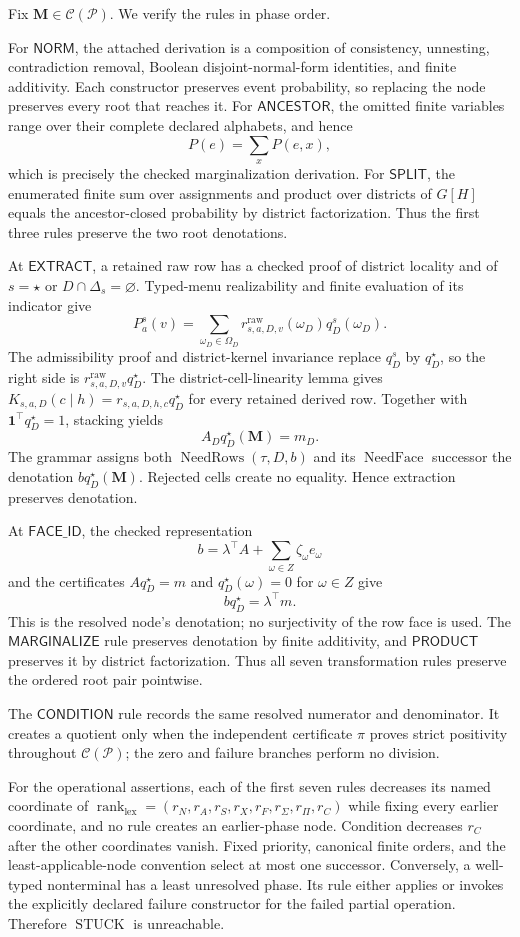 Fix \(\mathbf M\in\mathcal C(\mathcal P)\).  We verify the rules in phase order.

For \(\mathsf{NORM}\), the attached derivation is a composition of consistency, unnesting, contradiction removal, Boolean disjoint-normal-form identities, and finite additivity.  Each constructor preserves event probability, so replacing the node preserves every root that reaches it.  For \(\mathsf{ANCESTOR}\), the omitted finite variables range over their complete declared alphabets, and hence
\[
P(e)=\sum_xP(e,x),
\]
which is precisely the checked marginalization derivation.  For \(\mathsf{SPLIT}\), the enumerated finite sum over assignments and product over districts of \(G[H]\) equals the ancestor-closed probability by district factorization.  Thus the first three rules preserve the two root denotations.

At \(\mathsf{EXTRACT}\), a retained raw row has a checked proof of district locality and of \(s=\star\) or \(D\cap\Delta_s=\varnothing\).  Typed-menu realizability and finite evaluation of its indicator give
\[
P_a^s(v)
=\sum_{\omega_D\in\Omega_D}r^{\mathrm{raw}}_{s,a,D,v}(\omega_D)q_D^s(\omega_D).
\]
The admissibility proof and district-kernel invariance replace \(q_D^s\) by \(q_D^\star\), so the right side is \(r^{\mathrm{raw}}_{s,a,D,v}q_D^\star\).  The district-cell-linearity lemma gives
\(
K_{s,a,D}(c\mid h)=r_{s,a,D,h,c}q_D^\star
\)
for every retained derived row.  Together with \(\mathbf 1^\top q_D^\star=1\), stacking yields
\[
A_Dq_D^\star(\mathbf M)=m_D.
\]
The grammar assigns both \(\operatorname{NeedRows}(\tau,D,b)\) and its \(\operatorname{NeedFace}\) successor the denotation \(bq_D^\star(\mathbf M)\).  Rejected cells create no equality.  Hence extraction preserves denotation.

At \(\mathsf{FACE\_ID}\), the checked representation
\[
b=\lambda^\top A+\sum_{\omega\in Z}\zeta_\omega e_\omega
\]
and the certificates \(Aq_D^\star=m\) and \(q_D^\star(\omega)=0\) for \(\omega\in Z\) give
\[
bq_D^\star=\lambda^\top m.
\]
This is the resolved node's denotation; no surjectivity of the row face is used.  The \(\mathsf{MARGINALIZE}\) rule preserves denotation by finite additivity, and \(\mathsf{PRODUCT}\) preserves it by district factorization.  Thus all seven transformation rules preserve the ordered root pair pointwise.

The \(\mathsf{CONDITION}\) rule records the same resolved numerator and denominator.  It creates a quotient only when the independent certificate \(\pi\) proves strict positivity throughout \(\mathcal C(\mathcal P)\); the zero and failure branches perform no division.

For the operational assertions, each of the first seven rules decreases its named coordinate of
\(
\operatorname{rank}_{\mathrm{lex}}=(r_N,r_A,r_S,r_X,r_F,r_{\Sigma},r_{\Pi},r_C)
\)
while fixing every earlier coordinate, and no rule creates an earlier-phase node.  Condition decreases \(r_C\) after the other coordinates vanish.  Fixed priority, canonical finite orders, and the least-applicable-node convention select at most one successor.  Conversely, a well-typed nonterminal has a least unresolved phase.  Its rule either applies or invokes the explicitly declared failure constructor for the failed partial operation.  Therefore \(\operatorname{STUCK}\) is unreachable.
